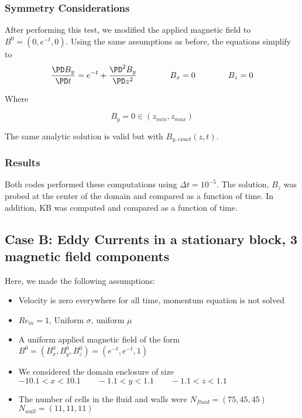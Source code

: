 \documentclass[11pt]{article}
\newcommand{\figS}{22.1em}
\newcommand{\figH}{\figS}
\newcommand{\figW}{\figS}
\begin{document}
\subsubsection{Symmetry Considerations}

After performing this test, we modified the applied magnetic field to $B^0=(0,e^{-t},0)$. Using the same assumptions as before, the equations simplify to
\begin{equation}
	\frac{\PD B_y}{\PD t}
	=
	e^{-t}
	+
	\frac{\PD^2 B_y}{\PD z^2}
	\qquad \qquad
	B_x = 0
	\qquad \qquad
	B_z = 0
\end{equation}

Where

\begin{equation}
	B_y = 0
	\in (z_{min}, z_{max})
\end{equation}

The same analytic solution is valid but with $B_{y,exact}(z,t)$.

\subsubsection{Results}
Both codes performed these computations using $\Delta t = 10^{-5}$. The solution, $B_z$ was probed at the center of the domain and compared as a function of time. In addition, KB was computed and compared as a function of time.


\subsection{Case B: Eddy Currents in a stationary block, 3 magnetic field components}
Here, we made the following assumptions:

\begin{itemize}
\item Velocity is zero everywhere for all time, momentum equation is not solved
\item $Re_m = 1$, Uniform $\sigma$, uniform $\mu$
\item A uniform applied magnetic field of the form $B^0 = (B_x^0,B_y^0,B_z^0) = (e^{-t},e^{-t},1)$
\item We considered the domain enclosure of size $-10.1 < x < 10.1 \qquad -1.1 < y < 1.1 \qquad -1.1 < z < 1.1$
\item The number of cells in the fluid and walls were $N_{fluid} = (75,45,45)$ \qquad $N_{wall} = (11,11,11)$
\end{itemize}
\end{document}
